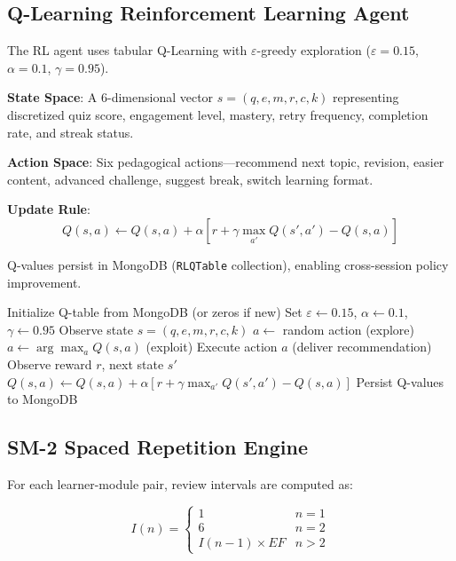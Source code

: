 \documentclass[conference]{IEEEtran}
\begin{document}
\subsection{Q-Learning Reinforcement Learning Agent}

The RL agent uses tabular Q-Learning with $\varepsilon$-greedy exploration ($\varepsilon = 0.15$, $\alpha = 0.1$, $\gamma = 0.95$).

\textbf{State Space}: A 6-dimensional vector $s = (q, e, m, r, c, k)$ representing discretized quiz score, engagement level, mastery, retry frequency, completion rate, and streak status.

\textbf{Action Space}: Six pedagogical actions---recommend next topic, revision, easier content, advanced challenge, suggest break, switch learning format.

\textbf{Update Rule}:
\begin{equation}
Q(s,a) \leftarrow Q(s,a) + \alpha[r + \gamma \max_{a'} Q(s',a') - Q(s,a)]
\end{equation}

Q-values persist in MongoDB (\texttt{RLQTable} collection), enabling cross-session policy improvement.

\begin{algorithm}
\caption{Q-Learning Recommendation Agent}
\label{alg:qlearning}
\begin{algorithmic}[1]
\STATE Initialize Q-table from MongoDB (or zeros if new)
\STATE Set $\varepsilon \leftarrow 0.15$, $\alpha \leftarrow 0.1$, $\gamma \leftarrow 0.95$
    \STATE Observe state $s = (q, e, m, r, c, k)$
        \STATE $a \leftarrow$ random action (explore)
    \ELSE
        \STATE $a \leftarrow \arg\max_a Q(s, a)$ (exploit)
    \ENDIF
    \STATE Execute action $a$ (deliver recommendation)
    \STATE Observe reward $r$, next state $s'$
    \STATE $Q(s,a) \leftarrow Q(s,a) + \alpha[r + \gamma \max_{a'} Q(s',a') - Q(s,a)]$
    \STATE Persist Q-values to MongoDB
\ENDFOR
\end{algorithmic}
\end{algorithm}

\subsection{SM-2 Spaced Repetition Engine}

For each learner-module pair, review intervals are computed as:

\begin{equation}
I(n) = \begin{cases} 1 & n = 1 \\ 6 & n = 2 \\ I(n-1) \times EF & n > 2 \end{cases}
\end{equation}
\end{document}
